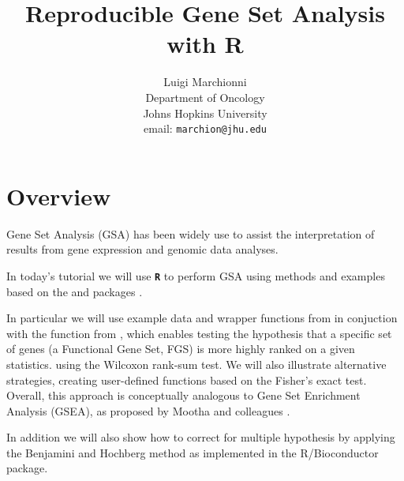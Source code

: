 \documentclass[11pt]{article}
\newcommand{\software}[1]{\textsf{\texttt{#1}}}
\newcommand{\R}{\software{\bf R}}
\newcommand{\Rcode}[1]{{\texttt{\color{BrickRed}{#1}}}}
\begin{document}




\title{Reproducible Gene Set Analysis with R}

\author{Luigi Marchionni \\
Department of Oncology \\
Johns Hopkins University \\
email: \texttt{marchion@jhu.edu}}


\maketitle
\tableofcontents





\newpage
\section{Overview}
Gene Set Analysis (GSA) has been widely use to assist the interpretation
of results from gene expression and genomic data analyses.

In today's tutorial we will use {\R} to perform GSA using methods and examples
based on the \Rcode{RTopper} \cite{Tyekucheva2011} and \Rcode{limma} packages
\cite{Smyth2005a,Smyth2004,Smyth2005}.

In particular we will use example data and wrapper functions from \Rcode{RTopper}
in conjuction with the \Rcode{GeneSetTest} function from \Rcode{limma}, 
which enables testing the hypothesis that a specific set of genes
(a Functional Gene Set, FGS) is more highly ranked on a given statistics.
using the Wilcoxon rank-sum test. We will also illustrate alternative
strategies, creating user-defined functions based on the Fisher's exact test.
Overall, this approach is conceptually analogous to
Gene Set Enrichment Analysis (GSEA), as proposed by Mootha 
and colleagues \cite{Mootha2003a,Subramanian2005}.

In addition we will also show how to correct for multiple hypothesis by
applying the Benjamini and Hochberg method \cite{Benjamini1995}
as implemented in the \Rcode{multtest} R/Bioconductor package.
\end{document}
